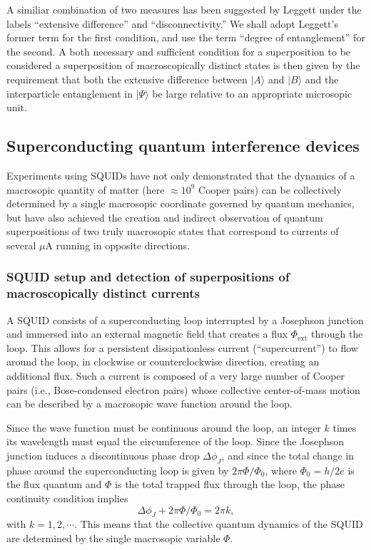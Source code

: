 \documentclass[twocolumn,aps,floatfix,amsmath,amssymb,showpacs,nofootinbib]{revtex4}
\newcommand{\be}{\begin{equation}} \newcommand{\ee}{\end{equation}}
\newcommand{\ket}[1]{\ensuremath{|{#1\rangle}}}
\begin{document}
\en

A similiar combination of two measures has been suggested by Leggett
\cite{Leggett:1980:yt,Leggett:2002:uy} under the labels ``extensive
difference'' and ``disconnectivity.'' We shall adopt Leggett's former
term for the first condition, and use the term ``degree of
entanglement'' for the second. A both necessary and sufficient
condition for a superposition to be considered a superposition of
macroscopically distinct states is then given by the requirement that
both the extensive difference between $\ket{A}$ and $\ket{B}$ and the
interparticle entanglement in $\ket{\Psi}$ be large relative to an
appropriate microsopic unit.
 

\subsection{Superconducting quantum interference
  devices} \label{sec:squid}

Experiments using SQUIDs have not only demonstrated that the dynamics
of a macrosopic quantity of matter (here $\approx 10^9$ Cooper pairs)
can be collectively determined by a single macrosopic coordinate
governed by quantum mechanics, but have also achieved the creation and
indirect observation of quantum superpositions of two truly macrosopic
states that correspond to currents of several $\mu$A running in
opposite directions.

\subsubsection{SQUID setup and detection of superpositions of
  macroscopically distinct currents}

A SQUID consists of a superconducting loop interrupted by a Josephson
junction and immersed into an external magnetic field that creates a
flux $\Phi_\text{ext}$ through the loop. This allows for a persistent
dissipationless current (``supercurrent'') to flow around the loop, in
clockwise or counterclockwise direction, creating an additional flux.
Such a current is composed of a very large number of Cooper pairs
(i.e., Bose-condensed electron pairs) whose collective center-of-mass
motion can be described by a macrosopic wave function around the loop.

Since the wave function must be continuous around the loop, an integer
$k$ times its wavelength must equal the circumference of the loop.
Since the Josephson junction induces a discontinuous phase drop
$\Delta \phi_J$, and since the total change in phase around the
superconducting loop is given by $2\pi\Phi/\Phi_0$, where
$\Phi_0=h/2e$ is the flux quantum and $\Phi$ is the total trapped flux
through the loop, the phase continuity condition implies
%
\be
\Delta \phi_J + 2\pi \Phi/\Phi_0 = 2\pi k,
\ee
%
with $k=1,2,\cdots$. This means that the collective quantum dynamics
of the SQUID are determined by the single macrosopic variable
$\Phi$.
\end{document}
